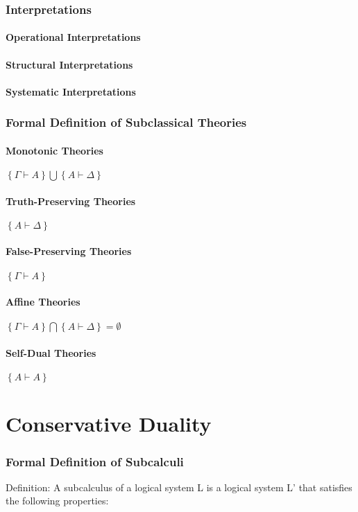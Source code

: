 \begin{center}
	\section{Interpretations}
		\subsection{Operational Interpretations}
		\subsection{Structural Interpretations}
		\subsection{Systematic Interpretations}
	\section{Formal Definition of Subclassical Theories}
		\subsection{Monotonic Theories}
		$\left\{ Γ ⊢ A \right\} \bigcup \left\{ A ⊢ Δ \right\}$
		\subsection{Truth-Preserving Theories}
		$\left\{ A ⊢ Δ \right\}$
		\subsection{False-Preserving Theories}
		$\left\{ Γ ⊢ A \right\}$
		\subsection{Affine Theories}
		$\left\{ Γ ⊢ A \right\} \bigcap \left\{ A ⊢ Δ \right\}=\emptyset$
		\subsection{Self-Dual Theories}
		$\left\{ A ⊢ A \right\}$
	
\end{center}

\part{Conservative Duality}
\section{Formal Definition of Subcalculi}
Definition: A subcalculus of a logical system L is a logical system L' that satisfies the following properties:


